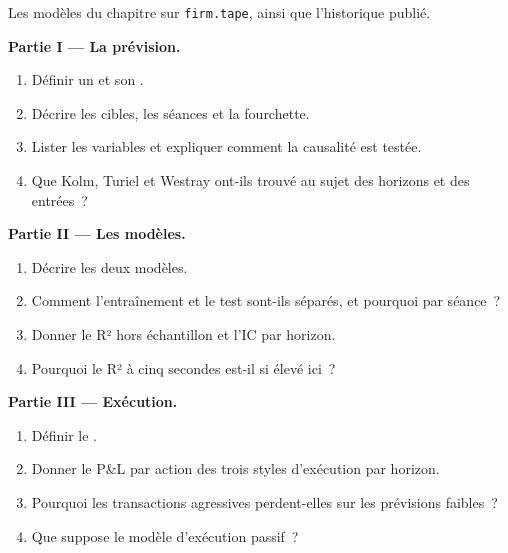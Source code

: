 \begin{problem}\label{pb:s1:intraday-machine-learned-alphas:1}
Les modèles du chapitre sur \texttt{firm.tape}, ainsi que l'historique publié.

\medskip\noindent\textbf{Partie I --- La prévision.}
\begin{enumerate}
\item Définir un  et son .
\item Décrire les cibles, les séances et la fourchette.
\item Lister les variables et expliquer comment la causalité est testée.
\item Que Kolm, Turiel et Westray ont-ils trouvé au sujet des horizons et des entrées~?
\end{enumerate}

\medskip\noindent\textbf{Partie II --- Les modèles.}
\begin{enumerate}[resume]
\item Décrire les deux modèles.
\item Comment l'entraînement et le test sont-ils séparés, et pourquoi par séance~?
\item Donner le R² hors échantillon et l'IC par horizon.
\item Pourquoi le R² à cinq secondes est-il si élevé ici~?
\end{enumerate}

\medskip\noindent\textbf{Partie III --- Exécution.}
\begin{enumerate}[resume]
\item Définir le .
\item Donner le P\&L par action des trois styles d'exécution par horizon.
\item Pourquoi les transactions agressives perdent-elles sur les prévisions faibles~?
\item Que suppose le modèle d'exécution passif~?
\end{enumerate}


\end{problem}
